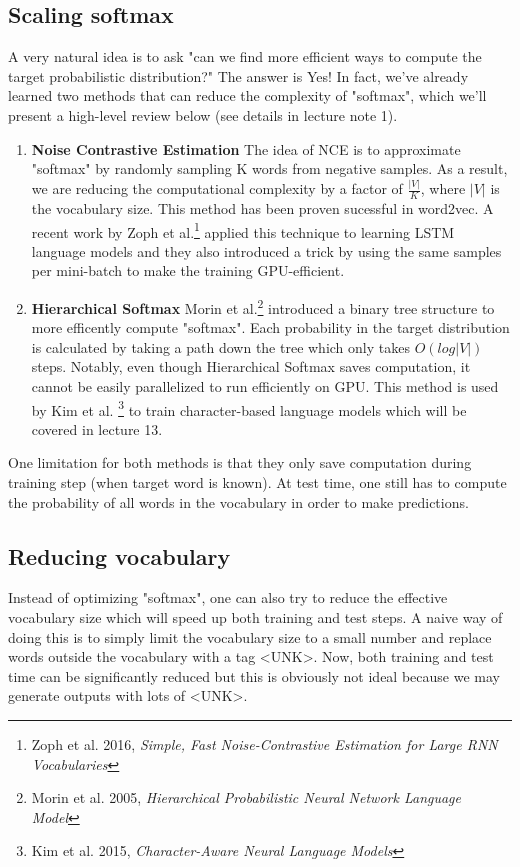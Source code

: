 \documentclass{tufte-handout}
\begin{document}
\subsection{Scaling softmax}
A very natural idea is to ask "can we find more efficient ways to compute the target probabilistic distribution?" The answer is Yes! In fact, we've already learned two methods that can reduce the complexity of "softmax", which we'll present a high-level review below (see details in lecture note 1).
\begin{enumerate}
\item \textbf{Noise Contrastive Estimation}\newline
The idea of NCE is to approximate "softmax" by randomly sampling K words from negative samples. As a result, we are reducing the computational complexity by a factor of $\frac{|V|}{K}$, where $|V|$ is the vocabulary size. This method has been proven sucessful in word2vec. A recent work by Zoph et al.\footnote{Zoph et al. 2016, \textit{Simple, Fast Noise-Contrastive Estimation for Large RNN Vocabularies}} applied this technique to learning LSTM language models and they also introduced a trick by using the same samples per mini-batch to make the training GPU-efficient.

\item \textbf{Hierarchical Softmax} \newline
Morin et al.\footnote{Morin et al. 2005, \textit{Hierarchical Probabilistic Neural Network Language Model}}
introduced a binary tree structure to more efficently compute "softmax". Each probability in the target distribution is calculated by taking a path down the tree which only takes $O(log|V|)$ steps. Notably, even though Hierarchical Softmax saves computation, it cannot be easily parallelized to run efficiently on GPU. This method is used by Kim et al. \footnote{Kim et al. 2015, \textit{Character-Aware Neural Language Models}} to train character-based language models which will be covered in lecture 13.
\end{enumerate}

One limitation for both methods is that they only save computation during training step (when target word is known). At test time, one still has to compute the probability of all words in the vocabulary in order to make predictions.
\subsection{Reducing vocabulary}
Instead of optimizing "softmax", one can also try to reduce the effective vocabulary size which will speed up both training and test steps. A naive way of doing this is to simply limit the vocabulary size to a small number and replace words outside the vocabulary with a tag <UNK>. Now, both training and test time can be significantly reduced but this is obviously not ideal because we may generate outputs with lots of <UNK>.
\end{document}
